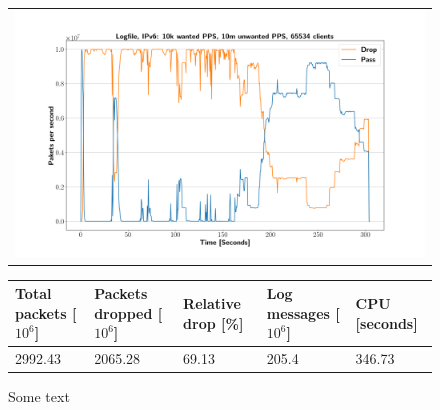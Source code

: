 \begin{figure}[!h]
	\label{fig:simplefail2ban:disk:ip6:10m}
	\centering
	\scriptsize
	\begin{tabular}{c}
    	\centerline{\includegraphics[width=1.2\textwidth]{images/simplefail2ban_disk_ipv6_v10k_iv10m_c65534.png}}
	\end{tabular}
	\begin{tabular}{lllll}
		\toprule
		\textbf{Total packets [$10^6$]} & \textbf{Packets dropped [$10^6$]} & \textbf{Relative drop [\%]} & \textbf{Log messages [$10^6$]} & \textbf{CPU [seconds]} \\ \midrule 
		2992.43 & 2065.28 & 69.13 & 205.4 & 346.73 \\
		\bottomrule
	\end{tabular}
	\caption[Simplefail2ban, Logfile IPv6, 10m \ac{PPS}]{Some text}
\end{figure}


